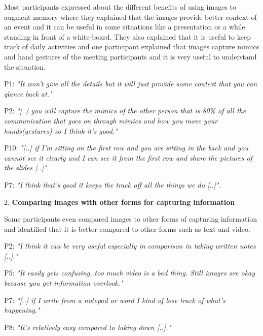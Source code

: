\documentclass[mscthesis]{usiinfthesis}
\begin{document}
Most participants expressed about the different benefits of using images to augment memory where they explained that the images provide better context of an event and it can be useful in some situations like a presentation or a while standing in front of a white-board. They also explained that it is useful to keep track of daily activities and one participant explained that images capture mimics and hand gestures of the meeting participants and it is very useful to understand the situation. 
\newline
\hspace{\parindent}\begin{adjustwidth}{1cm}{1cm}

\hspace{\parindent}P1: \textit{"It won't give all the details but it will just provide some context that you can glance back at."}

P2: \textit{"[..] you will capture the mimics of the other person that is 80\% of all the communication that goes on through mimics and how you move your hands(gestures) so I think it's good."}

P10: \textit{"[..] if I'm sitting on the first row and you are sitting in the back and you cannot see it clearly and I can see it from the first row and share the pictures of the slides [..]".}

P7: \textit{"I think that's good it keeps the track off all the things we do [..]".}
\newline
\end{adjustwidth}

2. \textbf{Comparing images with other forms for capturing information}

Some participants even compared images to other forms of capturing information and identified that it is better compared to other forms such as text and video. 
\newline
\hspace{\parindent}\begin{adjustwidth}{1cm}{1cm}

\hspace{\parindent}P2: \textit{"I think it can be very useful especially in comparison in taking written notes [..]."}

P5: \textit{"It easily gets confusing, too much video is a bad thing. Still images are okay because you get information overlook."}

P7: \textit{"[..] if I write from a notepad or word I kind of lose track  of what's happening."}

P8: \textit{"It's relatively easy compared to taking down [..]."}
\newline
\end{adjustwidth}
\end{document}
